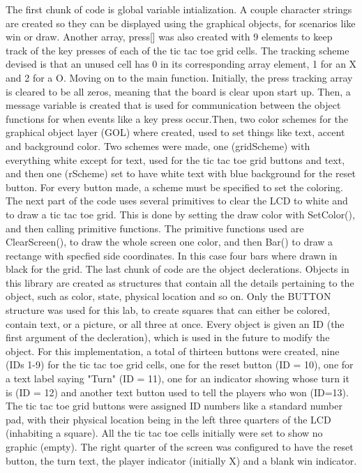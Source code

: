 \documentclass[12pt]{article}
\begin{document}
The first chunk of code is global variable intialization. A couple character strings are created so they can be displayed using the graphical objects, for scenarios like win or draw. Another array, press[] was also created with 9 elements to keep track of the key presses of each of the tic tac toe grid cells. The tracking scheme devised is that an unused cell has 0 in its corresponding array element, 1 for an X and 2 for a O. Moving on to the main function. Initially, the press tracking array is cleared to be all zeros, meaning that the board is clear upon start up. Then, a  message variable is created that is used for communication between the object functions for when events like a key press occur.Then, two color schemes for the graphical object layer (GOL) where created, used to set things like text, accent and background color. Two schemes were made, one (gridScheme) with everything white except for text, used for the tic tac toe grid buttons and text, and then one (rScheme) set to have white text with blue background for the reset button. For every button made, a scheme must be specified to set the coloring. The next part of the code uses several primitives to clear the LCD to white and to draw a tic tac toe grid. This is done by setting the draw color with SetColor(), and then calling primitive functions. The primitive functions used are ClearScreen(), to draw the whole screen one color, and then Bar() to draw a rectange with specfied side coordinates. In this case four bars where drawn in black for the grid. The last chunk of code are the object declerations. Objects in this library are created as structures that contain all the details pertaining to the object, such as color, state, physical location and so on. Only the BUTTON structure was used for this lab, to create squares that can either be colored, contain text, or a picture, or all three at once. Every object is given an ID (the first argument of the decleration), which is used in the future to modify the object. For this implementation, a total of thirteen buttons were created, nine (IDs 1-9) for the tic tac toe grid cells, one for the reset button (ID = 10), one for a text label saying "Turn" (ID = 11), one for an indicator showing whose turn it is (ID = 12) and another text button used to tell the players who won (ID=13). The tic tac toe grid buttons were assigned ID numbers like a standard number pad, with their physical location being in the left three quarters of the LCD (inhabiting a square). All the tic tac toe cells initially were set to show no graphic (empty). The right quarter of the screen was configured to have the reset button, the turn text, the player indicator (initially X) and a blank win indicator. 
\end{document}
